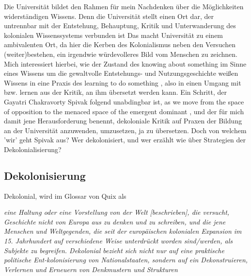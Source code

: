 \documentclass[11pt]{article}
\newenvironment{myenv}{\begin{adjustwidth}{2cm}{}}{\end{adjustwidth}}
\begin{document}
Die Universität bildet den Rahmen für mein Nachdenken über die Möglichkeiten
widerständigen Wissens.  Denn die Universität stellt einen Ort dar, der
untrennbar mit der Entstehung, Behauptung, Kritik und Unterwanderung des
kolonialen Wissenssystems verbunden ist Das macht Universität zu einem
ambivalenten Ort, da hier die Kerben des Kolonialismus neben den Versuchen
(weiter)bestehen, ein irgendwie würdevolleres Bild vom Menschen zu zeichnen.
Mich interessiert hierbei, wie der Zustand des \glqq knowing about something
\grqq im Sinne eines Wissens um die gewaltvolle Entstehungs- und
Nutzungsgeschichte weißen Wissens in eine Praxis des \glqq learning to do
something \grqq, also in einen Umgang mit bzw. lernen aus der Kritik, an ihm
übersetzt werden kann. Ein Schritt, der Gayatri Chakravorty Spivak folgend
unabdingbar ist, \glqq as we move from the space of opposition to the menaced
space of the emergent dominant \grqq, und der für mich damit jene
Herausforderung benennt, dekoloniale Kritik auf Praxen der Bildung an der
Universität anzuwenden, umzusetzen, ja zu übersetzen.  Doch von welchem 'wir'
geht Spivak aus? Wer dekolonisiert, und wer erzählt wie über Strategien der
Dekolonialisierung?

\subsection{Dekolonisierung}

Dekolonial, wird im Glossar von Quix  als

\begin{myenv}

  \textit{ \glqq eine Haltung oder eine Vorstellung von der Welt [beschrieben],
    die versucht, Geschichte nicht von Europa aus zu denken und zu schreiben,
    und die jene Menschen und Weltgegenden, die seit der europäischen kolonialen
    Expansion im 15. Jahrhundert auf verschiedene Weise unterdrückt worden
    sind/werden, als Subjekte zu begreifen. Dekolonial bezieht sich nicht nur
    auf eine praktische politische Ent-kolonisierung von Nationalstaaten,
    sondern auf ein Dekonstruieren, Verlernen und Erneuern von Denkmustern und
    Strukturen \grqq \footnotemark {} } \end{myenv}
\end{document}

